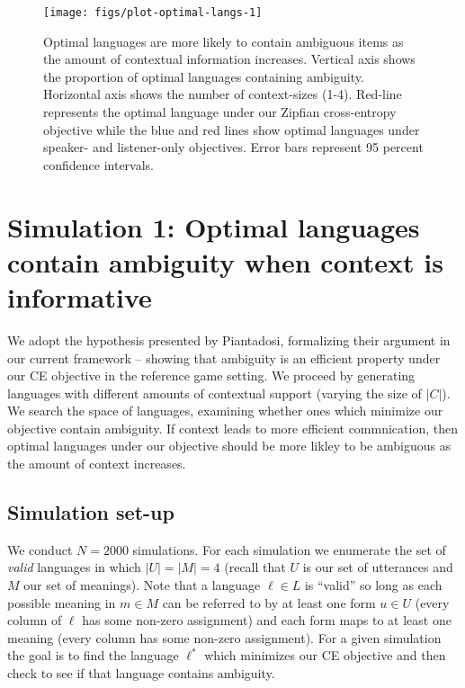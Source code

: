 \documentclass[10pt, letterpaper]{article}
\newenvironment{CodeChunk}{}{}
\begin{document}
\begin{CodeChunk}
\begin{figure*}[h]

{\centering \texttt{[image: figs/plot-optimal-langs-1]} 

}

\caption[Optimal languages are more likely to contain ambiguous items as the amount of contextual information increases]{Optimal languages are more likely to contain ambiguous items as the amount of contextual information increases. Vertical axis shows the proportion of optimal languages containing ambiguity. Horizontal axis shows the number of context-sizes (1-4). Red-line represents the optimal language under our Zipfian cross-entropy objective while the blue and red lines show optimal languages under speaker- and listener-only objectives. Error bars represent 95 percent confidence intervals.}\label{fig:plot-optimal-langs}
\end{figure*}
\end{CodeChunk}

\section{Simulation 1: Optimal languages contain ambiguity when context
is
informative}\label{simulation-1-optimal-languages-contain-ambiguity-when-context-is-informative}

We adopt the hypothesis presented by Piantadosi, formalizing their
argument in our current framework -- showing that ambiguity is an
efficient property under our CE objective in the reference game setting.
We proceed by generating languages with different amounts of contextual
support (varying the size of \(|C|\)). We search the space of languages,
examining whether ones which minimize our objective contain ambiguity.
If context leads to more efficient commnication, then optimal languages
under our objective should be more likley to be ambiguous as the amount
of context increases.\par

\subsection{Simulation set-up}\label{simulation-set-up}

We conduct \(N=2000\) simulations. For each simulation we enumerate the
set of \emph{valid} languages in which \(|U|=|M|=4\) (recall that \(U\)
is our set of utterances and \(M\) our set of meanings). Note that a
language \(\ell \in L\) is ``valid'' so long as each possible meaning in
\(m \in M\) can be referred to by at least one form \(u \in U\) (every
column of \(\ell\) has some non-zero assignment) and each form maps to
at least one meaning (every column has some non-zero assignment). For a
given simulation the goal is to find the language \(\ell^*\) which
minimizes our CE objective and then check to see if that language
contains ambiguity.\par
\end{document}
